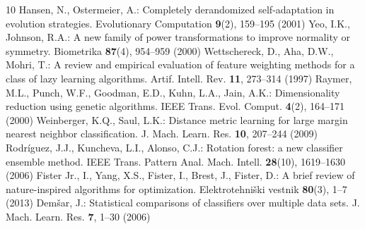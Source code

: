 \documentclass[runningheads]{llncs}
\begin{document}
\begin{thebibliography}{10}
 Hansen, N., Ostermeier, A.: Completely derandomized self-adaptation in evolution strategies.
Evolutionary Computation \textbf{9}(2), 159--195 (2001)
 Yeo, I.K., Johnson, R.A.: A new family of power transformations to improve normality or symmetry.
Biometrika \textbf{87}(4), 954--959 (2000)
 Wettschereck, D., Aha, D.W., Mohri, T.: A review and empirical evaluation of feature
weighting methods for a class of lazy learning algorithms. Artif. Intell. Rev. \textbf{11}, 273--314 (1997)
 Raymer, M.L., Punch, W.F., Goodman, E.D., Kuhn, L.A., Jain, A.K.: Dimensionality reduction using
genetic algorithms. IEEE Trans. Evol. Comput. \textbf{4}(2), 164--171 (2000)
 Weinberger, K.Q., Saul, L.K.: Distance metric learning for large margin nearest neighbor
classification. J. Mach. Learn. Res. \textbf{10}, 207--244 (2009)
 Rodríguez, J.J., Kuncheva, L.I., Alonso, C.J.: Rotation forest: a new classifier ensemble
method. IEEE Trans. Pattern Anal. Mach. Intell. \textbf{28}(10), 1619--1630 (2006)
 Fister Jr., I., Yang, X.S., Fister, I., Brest, J., Fister, D.: A brief review of
nature-inspired algorithms for optimization. Elektrotehniški vestnik \textbf{80}(3), 1--7 (2013)
 Demšar, J.: Statistical comparisons of classifiers over multiple data sets. J. Mach. Learn.
Res. \textbf{7}, 1--30 (2006)
\end{thebibliography}
\end{document}
